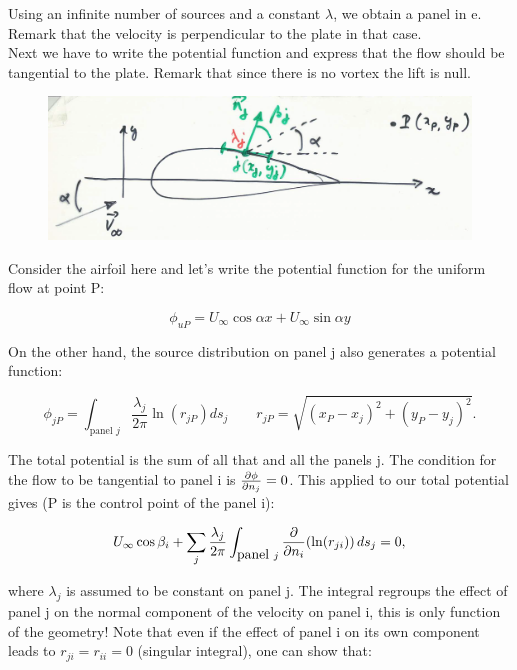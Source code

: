 	Using an infinite number of sources and a constant $\lambda$, we obtain a panel in e. Remark that the velocity is perpendicular to the plate in that case. \\
	
	Next we have to write the potential function and express that the flow should be tangential to the plate. Remark that since there is no vortex the lift is null. 
	
	\begin{figure}
	\vspace{-5mm}
	\includegraphics[scale=0.18]{ch2/41}
	\end{figure}
	Consider the airfoil here and let's write the potential function for the uniform flow at point P:
	
	\begin{equation}
	\phi _{uP} = U_\infty \cos \alpha x + U_\infty \sin \alpha y
	\end{equation}
	 
	 On the other hand, the source distribution on panel j also generates a potential function:
	 
	 \begin{equation}
	 \phi _{jP} = \int _{\mbox{panel } j} \frac{\lambda _j}{2\pi} \ln (r_{jP})ds_j\qquad r_{jP} = \sqrt{(x_P - x_j)^2 + (y_P - y_j)^2}.
	 \end{equation}
	 
	 The total potential is the sum of all that and all the panels j. The condition for the flow to be tangential to panel i is $\frac{\D \phi}{\D n_j} = 0$. This applied to our total potential gives (P is the control point of the panel i):
	 
	 \begin{equation}
	 U_\infty \cos \beta _i + \sum _j \frac{\lambda _j}{2\pi} \int _{\mbox{panel }j} \frac{\D}{\D n_i} (\ln (r_{ji})) \, ds_j = 0,
	 \end{equation}
	 
	 where $\lambda _j$ is assumed to be constant on panel j. The integral regroups the effect of panel j on the normal component of the velocity on panel i, this is only function of the geometry! Note that even if the effect of panel i on its own component leads to $r_{ji} = r_{ii} = 0$ (singular integral), one can show that:
	 
